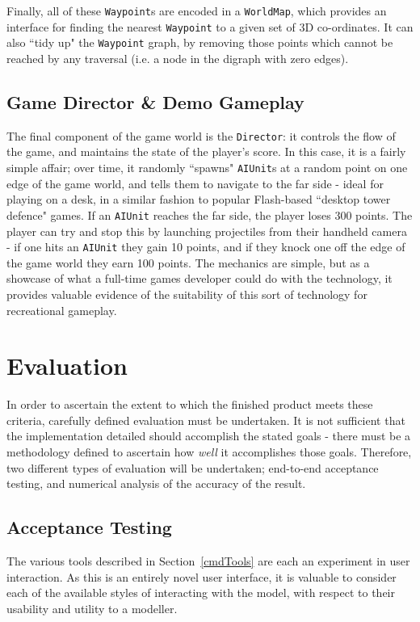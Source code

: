 \documentclass[a4paper,10pt]{article}
\begin{document}
Finally, all of these \texttt{Waypoint}s are encoded in a \texttt{WorldMap}, which provides an interface for finding the nearest \texttt{Waypoint} to a given set of 3D co-ordinates. It can also ``tidy up" the \texttt{Waypoint} graph, by removing those points which cannot be reached by any traversal (i.e. a node in the digraph with zero edges).

\subsection{Game Director \& Demo Gameplay}
The final component of the game world is the \texttt{Director}: it controls the flow of the game, and maintains the state of the player's score. In this case, it is a fairly simple affair; over time, it randomly ``spawns" \texttt{AIUnit}s at a random point on one edge of the game world, and tells them to navigate to the far side - ideal for playing on a desk, in a similar fashion to popular Flash-based ``desktop tower defence" games. If an \texttt{AIUnit} reaches the far side, the player loses 300 points. The player can try and stop this by launching projectiles from their handheld camera - if one hits an \texttt{AIUnit} they gain 10 points, and if they knock one off the edge of the game world they earn 100 points. The mechanics are simple, but as a showcase of what a full-time games developer could do with the technology, it provides valuable evidence of the suitability of this sort of technology for recreational gameplay.

\clearpage

\section{Evaluation}
In order to ascertain the extent to which the finished product meets these criteria, carefully defined evaluation must be undertaken. It is not sufficient that the implementation detailed should accomplish the stated goals - there must be a methodology defined to ascertain how \textit{well} it accomplishes those goals. Therefore, two different types of evaluation will be undertaken; end-to-end acceptance testing, and numerical analysis of the accuracy of the result.

\subsection{Acceptance Testing}
The various tools described in Section~\ref{cmdTools} are each an experiment in user interaction. As this is an entirely novel user interface, it is valuable to consider each of the available styles of interacting with the model, with respect to their usability and utility to a modeller.
\end{document}
